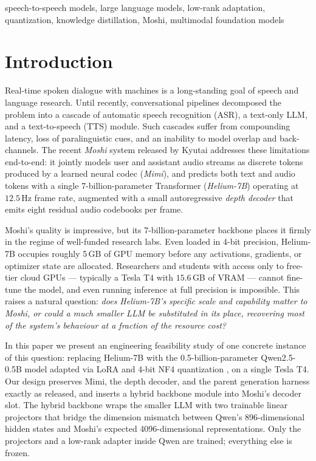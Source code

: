 \documentclass[conference]{IEEEtran}
\begin{document}
\begin{IEEEkeywords}
speech-to-speech models, large language models, low-rank adaptation, quantization, knowledge distillation, Moshi, multimodal foundation models
\end{IEEEkeywords}

\section{Introduction}

Real-time spoken dialogue with machines is a long-standing goal of speech and language research. Until recently, conversational pipelines decomposed the problem into a cascade of automatic speech recognition (ASR), a text-only LLM, and a text-to-speech (TTS) module. Such cascades suffer from compounding latency, loss of paralinguistic cues, and an inability to model overlap and back-channels. The recent \emph{Moshi} system released by Kyutai \cite{moshi2024} addresses these limitations end-to-end: it jointly models user and assistant audio streams as discrete tokens produced by a learned neural codec (\emph{Mimi}), and predicts both text and audio tokens with a single 7-billion-parameter Transformer (\emph{Helium-7B}) operating at $12.5$\,Hz frame rate, augmented with a small autoregressive \emph{depth decoder} that emits eight residual audio codebooks per frame.

Moshi's quality is impressive, but its 7-billion-parameter backbone places it firmly in the regime of well-funded research labs. Even loaded in 4-bit precision, Helium-7B occupies roughly 5\,GB of GPU memory before any activations, gradients, or optimizer state are allocated. Researchers and students with access only to free-tier cloud GPUs --- typically a Tesla T4 with $15.6$\,GB of VRAM \cite{colab2023} --- cannot fine-tune the model, and even running inference at full precision is impossible. This raises a natural question: \emph{does Helium-7B's specific scale and capability matter to Moshi, or could a much smaller LLM be substituted in its place, recovering most of the system's behaviour at a fraction of the resource cost?}

In this paper we present an engineering feasibility study of one concrete instance of this question: replacing Helium-7B with the 0.5-billion-parameter Qwen2.5-0.5B model \cite{qwen25} adapted via LoRA \cite{lora2021} and 4-bit NF4 quantization \cite{qlora2023}, on a single Tesla T4. Our design preserves Mimi, the depth decoder, and the parent generation harness exactly as released, and inserts a hybrid backbone module into Moshi's decoder slot. The hybrid backbone wraps the smaller LLM with two trainable linear projectors that bridge the dimension mismatch between Qwen's 896-dimensional hidden states and Moshi's expected 4096-dimensional representations. Only the projectors and a low-rank adapter inside Qwen are trained; everything else is frozen.
\end{document}
